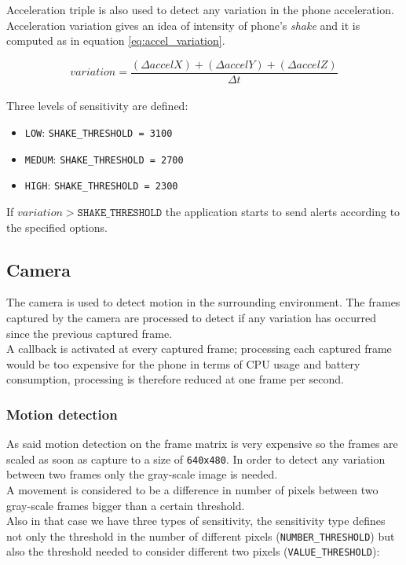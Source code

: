 \documentclass[conference, 11pt]{IEEEtran}
\begin{document}
Acceleration triple is also used to detect any variation in the phone acceleration. Acceleration variation gives an idea of intensity of phone's \textit{shake} and it is computed as in equation \ref{eq:accel_variation}.

\begin{equation}
variation = \frac{(\Delta accelX)+(\Delta accelY)+(\Delta accelZ)}{\Delta t}
\label{eq:accel_variation}
\end{equation}\\
Three levels of sensitivity are defined:
\begin{itemize}
	\item \texttt{LOW}: \texttt{SHAKE\_THRESHOLD = 3100}
	\item \texttt{MEDUM}:  \texttt{SHAKE\_THRESHOLD = 2700}
	\item \texttt{HIGH}:  \texttt{SHAKE\_THRESHOLD = 2300}
\end{itemize}

If $variation>\texttt{SHAKE\_THRESHOLD}$ the application starts to send alerts according to the specified options.

\subsection{\textbf{Camera}}
The camera is used to detect motion in the surrounding environment. The frames captured by the camera are processed to detect if any variation has occurred since the previous captured frame.\\
A callback is activated at every captured frame; processing each captured frame would be too expensive for the phone in terms of CPU usage and battery consumption, processing is therefore reduced at one frame per second.\\
\subsubsection{\textbf{Motion detection}}
As said motion detection on the frame matrix is very expensive so the frames are scaled as soon as capture to a size of \texttt{640x480}. In order to detect any variation between two frames only the gray-scale image is needed.\\
A movement is considered to be a difference in number of pixels between two gray-scale frames bigger than a certain threshold.\\
Also in that case we have three types of sensitivity, the sensitivity type defines not only the threshold in the number of different pixels (\texttt{NUMBER\_THRESHOLD}) but also the threshold needed to consider different two pixels (\texttt{VALUE\_THRESHOLD}):
\end{document}

